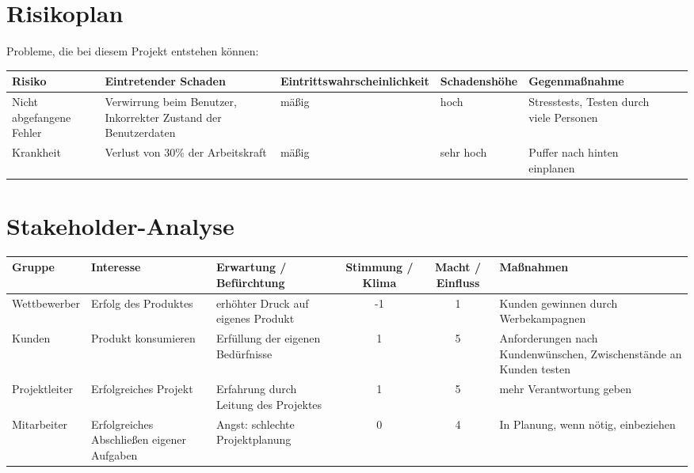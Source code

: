 %
%	

\begin{landscape}
\begin{center}
\section{Risikoplan}
Probleme, die bei diesem Projekt entstehen können:
\medskip

\begin{tabulary}{1.35\textwidth}{|L|L|L|L|L|L|L|}
\hline 
\textbf{Risiko} & \textbf{Eintretender Schaden} & \textbf{Eintrittswahrscheinlichkeit} & \textbf{Schadenshöhe} & \textbf{Gegenmaßnahme} \\ 
\hline 
Nicht abgefangene Fehler & Verwirrung beim Benutzer, Inkorrekter Zustand der Benutzerdaten & mäßig & hoch & Stresstests, Testen durch viele Personen\\ 
\hline
Krankheit & Verlust von 30\% der Arbeitskraft & mäßig & sehr hoch & Puffer nach hinten einplanen \\ 
\hline
\end{tabulary}

\bigskip
\section{Stakeholder-Analyse}
\begin{tabulary}{1.35\textwidth}{|L|L|L|C|C|L|}
\hline 
\textbf{Gruppe} & \textbf{Interesse} & \textbf{Erwartung / Befürchtung} & \textbf{Stimmung / Klima} & \textbf{Macht / Einfluss} & \textbf{Maßnahmen} \\ 
\hline 
Wettbewerber & Erfolg des Produktes & erhöhter Druck auf eigenes Produkt & -1 & 1 & Kunden gewinnen durch Werbekampagnen \\ 
\hline 
Kunden & Produkt konsumieren & Erfüllung der eigenen Bedürfnisse & 1 & 5 & Anforderungen nach Kundenwünschen, Zwischenstände an Kunden testen \\ 
\hline 
Projektleiter & Erfolgreiches Projekt & Erfahrung durch Leitung des Projektes & 1 & 5 & mehr Verantwortung geben \\ 
\hline 
Mitarbeiter & Erfolgreiches Abschließen eigener Aufgaben & Angst: schlechte Projektplanung & 0 & 4 & In Planung, wenn nötig, einbeziehen \\ 
\hline
\end{tabulary} 
 

\end{center}
\end{landscape}
